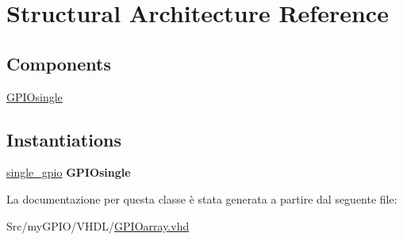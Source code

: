 \hypertarget{class_g_p_i_oarray_1_1_structural}{\section{Structural Architecture Reference}
\label{class_g_p_i_oarray_1_1_structural}
}
\subsection*{Components}
 \begin{DoxyCompactItemize}
\item 
\hypertarget{class_g_p_i_oarray_1_1_structural_ga1ef3f8a153dc3cf7c70b202d716ca7af}{\hyperlink{group___g_p_i_o-array_ga1ef3f8a153dc3cf7c70b202d716ca7af}{G\+P\+I\+Osingle}  {\bfseries }  }\label{class_g_p_i_oarray_1_1_structural_ga1ef3f8a153dc3cf7c70b202d716ca7af}

\end{DoxyCompactItemize}
\subsection*{Instantiations}
 \begin{DoxyCompactItemize}
\item 
\hypertarget{class_g_p_i_oarray_1_1_structural_ada2b130a1b666efc29e68e8f9f429d43}{\hyperlink{class_g_p_i_oarray_1_1_structural_ada2b130a1b666efc29e68e8f9f429d43}{single\+\_\+gpio}  {\bfseries G\+P\+I\+Osingle}   }\label{class_g_p_i_oarray_1_1_structural_ada2b130a1b666efc29e68e8f9f429d43}

\end{DoxyCompactItemize}


La documentazione per questa classe è stata generata a partire dal seguente file\+:\begin{DoxyCompactItemize}
\item 
Src/my\+G\+P\+I\+O/\+V\+H\+D\+L/\hyperlink{_g_p_i_oarray_8vhd}{G\+P\+I\+Oarray.\+vhd}\end{DoxyCompactItemize}

